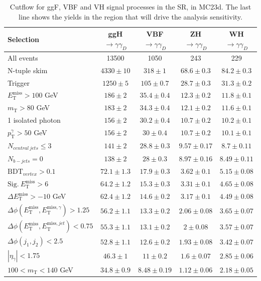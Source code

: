 \begin{table}[h!]
\centering
\caption{Cutflow for ggF, VBF and VH signal processes in the SR, in MC23d. The last line shows the yields in the \mT region that will drive the analysis sensitivity.}
\scriptsize
\label{tab:cutflow_mc23d_signal}
\begin{tabular}{lcccc}
\hline
Selection & ggH$\to\gamma\gamma_D$ & VBF$\to\gamma\gamma_D$  & ZH$\to\gamma\gamma_D$  & WH$\to\gamma\gamma_D$  \\
\hline
All events & 13500 & 1050 & 243 & 229 \\
N-tuple skim & $4330 \pm 10$ & $ 318 \pm 1 $ & $68.6 \pm 0.3$  & $84.2 \pm 0.3$ \\  
Trigger & $1250 \pm 5$ & $105 \pm 0.7$ & $28.7 \pm 0.3$ & $31.3 \pm 0.2$ \\
$E_{\mathrm{T}}^{\mathrm{miss}}>100$ GeV & $186 \pm 2$ & $35.4 \pm 0.4$ & $12.3 \pm 0.2$ & $11.8 \pm 0.1$ \\
$m_{\mathrm{T}}>80$ GeV & $183 \pm 2$ & $34.3 \pm 0.4$ & $12.1 \pm 0.2$ & $11.6 \pm 0.1$ \\
1 isolated photon & $156 \pm 2$ & $30.2 \pm 0.4$ & $10.7 \pm 0.2$ & $10.2 \pm 0.1$ \\
$p_{\mathrm{T}}^{\gamma}>50$ GeV & $156 \pm 2$ & $30 \pm 0.4$ & $10.7 \pm 0.2$ & $10.1 \pm 0.1$ \\
$N_{central\ jets}\leq 3$ & $141 \pm 2$ & $28.8 \pm 0.3$ & $9.57 \pm 0.17$ & $8.7 \pm 0.11$ \\
$N_{b-jets}=0$ & $138 \pm 2$ & $28 \pm 0.3$ & $8.97 \pm 0.16$ & $8.49 \pm 0.11$ \\
$\mathrm{BDT}_{vertex}>0.1$ & $72.1 \pm 1.3$ & $17.9 \pm 0.3$ & $3.62 \pm 0.1$ & $5.15 \pm 0.08$ \\
$\mathrm{Sig.}\ E_{\mathrm{T}}^{\mathrm{miss}}>6$ & $64.2 \pm 1.2$ & $15.3 \pm 0.3$ & $3.31 \pm 0.1$ & $4.65 \pm 0.08$ \\
$\Delta E_{\mathrm{T}}^{\mathrm{miss}} >-10$ GeV & $62.4 \pm 1.2$ & $14.6 \pm 0.2$ & $3.17 \pm 0.1$ & $4.49 \pm 0.08$ \\
$\Delta\phi(E_{\mathrm{T}}^{\mathrm{miss}},E_{\mathrm{T}}^{\mathrm{miss},\gamma})>1.25$ & $56.2 \pm 1.1$ & $13.3 \pm 0.2$ & $2.06 \pm 0.08$ & $3.65 \pm 0.07$ \\
$\Delta\phi(E_{\mathrm{T}}^{\mathrm{miss}},E_{\mathrm{T}}^{\mathrm{miss},jet})<0.75$ & $55.3 \pm 1.1$ & $13.1 \pm 0.2$ & $2 \pm 0.08$ & $3.57 \pm 0.07$ \\
$\Delta\phi(j_1,j_2)<2.5$ & $52.8 \pm 1.1$ & $12.6 \pm 0.2$ & $1.93 \pm 0.08$ & $3.42 \pm 0.07$ \\
$|\eta_{\gamma}|<1.75$ & $46.3 \pm 1$ & $11 \pm 0.2$ & $1.6 \pm 0.07$ & $2.85 \pm 0.06$ \\
$100 < m_{\mathrm{T}} < 140$ GeV & $34.8 \pm 0.9$ & $8.48 \pm 0.19$ & $1.12 \pm 0.06$ & $2.18 \pm 0.05$ \\
\hline

\end{tabular}

\end{table}


